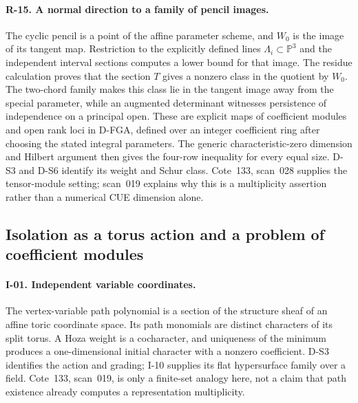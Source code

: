 \paragraph{R-15. A normal direction to a family of pencil images.}
The cyclic pencil is a point of the affine parameter scheme, and $W_0$ is the image of its tangent map. Restriction to the explicitly defined lines $\Lambda_i\subset\mathbb P^3$ and the independent interval sections computes a lower bound for that image. The residue calculation proves that the section $T$ gives a nonzero class in the quotient by $W_0$. The two-chord family makes this class lie in the tangent image away from the special parameter, while an augmented determinant witnesses persistence of independence on a principal open. These are explicit maps of coefficient modules and open rank loci in D-FGA, defined over an integer coefficient ring after choosing the stated integral parameters. The generic characteristic-zero dimension and Hilbert argument then gives the four-row inequality for every equal size. D-S3 and D-S6 identify its weight and Schur class. Cote~133, scan~028 supplies the tensor-module setting; scan~019 explains why this is a multiplicity assertion rather than a numerical CUE dimension alone.

\subsection{Isolation as a torus action and a problem of coefficient modules}

\paragraph{I-01. Independent variable coordinates.}
The vertex-variable path polynomial is a section of the structure sheaf of an affine toric coordinate space. Its path monomials are distinct characters of its split torus. A Hoza weight is a cocharacter, and uniqueness of the minimum produces a one-dimensional initial character with a nonzero coefficient. D-S3 identifies the action and grading; I-10 supplies its flat hypersurface family over a field. Cote~133, scan~019, is only a finite-set analogy here, not a claim that path existence already computes a representation multiplicity.

